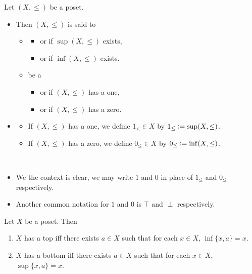 \documentclass{book}
\begin{document}
	\begin{defn} 
		Let $(X, \leq)$ be a poset. 
		\begin{itemize}
			\item Then $(X, \leq)$ is said to
			\begin{itemize}
				\item 
				\begin{itemize}
					\item {} or  if $\sup (X, \leq)$ exists,
					\item {} or  if $\inf (X, \leq)$ exists.
				\end{itemize}
				\item be a 
				\begin{itemize}
					\item  {} or  if $(X, \leq)$ has a one,
					\item {} or  if $(X, \leq)$ has a zero.
				\end{itemize}
			\end{itemize}
			\item 
			\begin{itemize}
				\item If $(X, \leq)$ has a one, we define $1_{\leq} \in X$ by $1_{\leq} \vcentcolon= \sup (X, \leq)$.
				\item If $(X, \leq)$ has a zero, we define $0_{\leq} \in X$ by $0_{\leq} \vcentcolon= \inf (X, \leq)$.
			\end{itemize}
		\end{itemize}
	\end{defn}
	
	\begin{note}\
		\begin{itemize}
			\item We the context is clear, we may write $1$ and $0$ in place of $1_{\leq}$ and $0_{\leq}$ respectively. 
			\item Another common notation for $1$ and $0$ is $\top$ and $\perp$ respectively.  
		\end{itemize}
	\end{note}
	
	\begin{ex} 
		Let $X$ be a poset. Then 
		\begin{enumerate}
			\item $X$ has a top iff there exists $a \in X$ such that for each $x \in X$, $\inf \{x, a\} = x$. 
			\item $X$ has a bottom iff there exists $a \in X$ such that for each $x \in X$, $\sup \{x, a\} = x$. 
		\end{enumerate}
	\end{ex}
	
\end{document}
